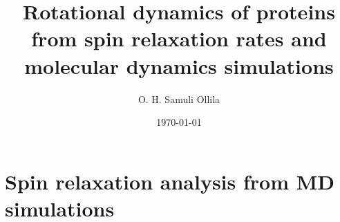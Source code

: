 \documentclass[pre,aps,floatfix,authordate1-4]{revtex4-1}
\begin{document}

\title{Rotational dynamics of proteins from spin relaxation rates and molecular dynamics simulations} %



\author{O. H. Samuli Ollila}


\date{\today}

\begin{abstract}
  
\end{abstract}


\maketitle %




\section{Spin relaxation analysis from MD simulations}
\end{document}
